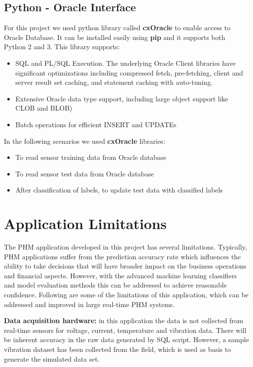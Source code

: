 \documentclass[sigconf]{acmart}
\begin{document}
\subsection{Python - Oracle Interface}
For this project we used python library called \textbf{cxOracle} \cite{OracleOTN} to enable access to Oracle Database. It can be installed easily using \textbf{pip} and it supports both Python 2 and 3. This library supports:
\begin{itemize}
  \item SQL and PL/SQL Execution. The underlying Oracle Client libraries have significant optimizations including compressed fetch, pre-fetching, client and server result set caching, and statement caching with auto-tuning.
  \item Extensive Oracle data type support, including large object support like CLOB and BLOB)
  \item Batch operations for efficient INSERT and UPDATEs
\end{itemize}

In the following scenarios we used \textbf{cxOracle} libraries:

\begin{itemize}
  \item To read sensor training data from Oracle database
  \item To read sensor test data from Oracle database
  \item After classification of labels, to update test data with classified labels
\end{itemize}

\section{Application Limitations}
The PHM application developed in this project has several limitations. Typically, PHM applications suffer from the prediction accuracy rate which influences the ability to take decisions that will have broader impact on the business operations and financial aspects. However, with the advanced machine learning classifiers and model evaluation methods this can be addressed to achieve reasonable confidence. Following are some of the limitations of this application, which can be addressed and improved in large real-time PHM systems.

\textbf{Data acquisition hardware:} in this application the data is not collected from real-time sensors for voltage, current, temperature and vibration data. There will be inherent accuracy in the raw data generated by SQL script. However, a sample vibration dataset has been collected from the field, which is used as basis to generate the simulated data set.
\end{document}
